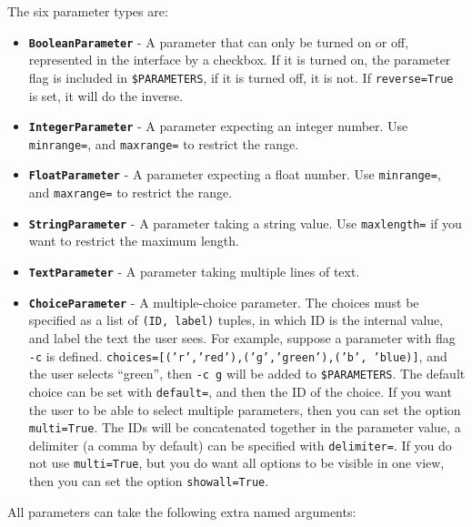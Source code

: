 \documentclass[a4paper,12pt]{report}
\begin{document}
The six parameter types are:

\begin{itemize}
\item \textbf{\texttt{BooleanParameter}} - A parameter that can only be turned on or off, represented in the interface by a checkbox. If it is turned on, the parameter flag is included in \texttt{\$PARAMETERS}, if it is turned off, it is not. If \texttt{reverse=True} is set, it will do the inverse.
\item \textbf{\texttt{IntegerParameter}} - A parameter expecting an integer number. Use \texttt{minrange=}, and \texttt{maxrange=} to restrict the range.
\item \textbf{\texttt{FloatParameter}} - A parameter expecting a float number. Use \texttt{minrange=}, and \texttt{maxrange=} to restrict the range.
\item \textbf{\texttt{StringParameter}} - A parameter taking a string value. Use \texttt{maxlength=} if you want to restrict the maximum length.
\item \textbf{\texttt{TextParameter}} - A parameter taking multiple lines of text. 
\item \textbf{\texttt{ChoiceParameter}} - A multiple-choice parameter. The choices must be specified as a list of \texttt{(ID, label)} tuples, in which ID is the internal value, and label the text the user sees. For example, suppose a parameter with flag \texttt{-c} is defined.  \texttt{choices=[('r','red'),('g','green'),('b', 'blue)]}, and the user selects ``green'', then  \texttt{-c g} will be added to \texttt{\$PARAMETERS}. The default choice can be set with \texttt{default=}, and then the ID of the choice. If you want the user to be able to select multiple parameters, then you can set the option \texttt{multi=True}. The IDs will be concatenated together in the parameter value, a delimiter (a comma by default) can be specified with \texttt{delimiter=}. If you do not use \texttt{multi=True}, but you do want all options to be visible in one view, then you can set the option \texttt{showall=True}.
\end{itemize}

All parameters can take the following extra named arguments:
\end{document}
